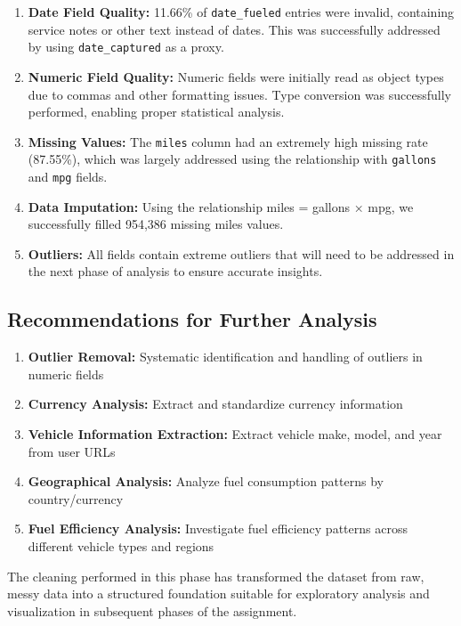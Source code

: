 \documentclass{article}
\begin{document}
\begin{enumerate}
    \item \textbf{Date Field Quality:} 11.66\% of \texttt{date\_fueled} entries were invalid, containing service notes or other text instead of dates. This was successfully addressed by using \texttt{date\_captured} as a proxy.
    
    \item \textbf{Numeric Field Quality:} Numeric fields were initially read as object types due to commas and other formatting issues. Type conversion was successfully performed, enabling proper statistical analysis.
    
    \item \textbf{Missing Values:} The \texttt{miles} column had an extremely high missing rate (87.55\%), which was largely addressed using the relationship with \texttt{gallons} and \texttt{mpg} fields.
    
    \item \textbf{Data Imputation:} Using the relationship miles = gallons × mpg, we successfully filled 954,386 missing miles values.
    
    \item \textbf{Outliers:} All fields contain extreme outliers that will need to be addressed in the next phase of analysis to ensure accurate insights.
\end{enumerate}

\subsection{Recommendations for Further Analysis}

\begin{enumerate}
    \item \textbf{Outlier Removal:} Systematic identification and handling of outliers in numeric fields
    \item \textbf{Currency Analysis:} Extract and standardize currency information
    \item \textbf{Vehicle Information Extraction:} Extract vehicle make, model, and year from user URLs
    \item \textbf{Geographical Analysis:} Analyze fuel consumption patterns by country/currency
    \item \textbf{Fuel Efficiency Analysis:} Investigate fuel efficiency patterns across different vehicle types and regions
\end{enumerate}

The cleaning performed in this phase has transformed the dataset from raw, messy data into a structured foundation suitable for exploratory analysis and visualization in subsequent phases of the assignment.
\end{document}
